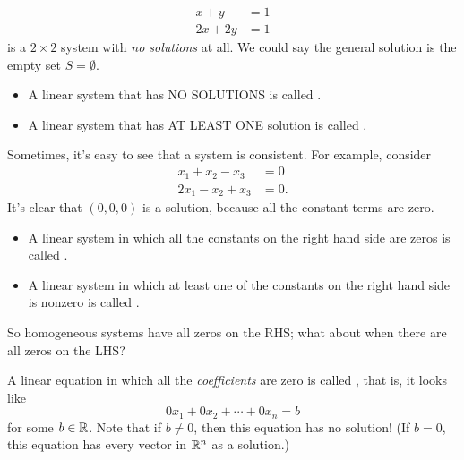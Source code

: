 \begin{myexample}
\begin{align*}
x +y &= 1\\
2x+2y &= 1
\end{align*}
is a $2\times 2$ system with \emph{no solutions} at all.  We could say
the general solution is the empty set $S = \emptyset$.
\end{myexample}

\begin{definition}
\begin{itemize}
\item A linear system that has NO SOLUTIONS is called .
\item A linear system that has AT LEAST ONE solution is called .
\end{itemize}
\end{definition}

Sometimes, it's easy to see that a system is consistent.  For example, consider
\begin{align*}
x_1 + x_2 - x_3 &= 0\\
2x_1 - x_2 + x_3 &= 0.
\end{align*}
It's clear that $(0,0,0)$ is a solution, because all the constant terms are zero.


\begin{definition}
\begin{itemize}
\item A linear system in which all the constants on the right hand side are
zeros is called .
\item A linear system in which at least one of the constants on the right hand
side is nonzero is called .
\end{itemize}
\end{definition}


So homogeneous systems have all zeros on the RHS; what about when
there are all zeros on the LHS?

\begin{definition}
A linear equation in which all the \emph{coefficients} are zero is called
, that is, it looks like
$$
0x_1 + 0x_2 + \cdots + 0x_n = b
$$
for some $b\in \mathbb{R}$.  Note that if $b\neq 0$, then this equation has 
no solution!  (If $b=0$, this equation has every vector in $\mathbb{R}^n$ as a solution.)
\end{definition}

